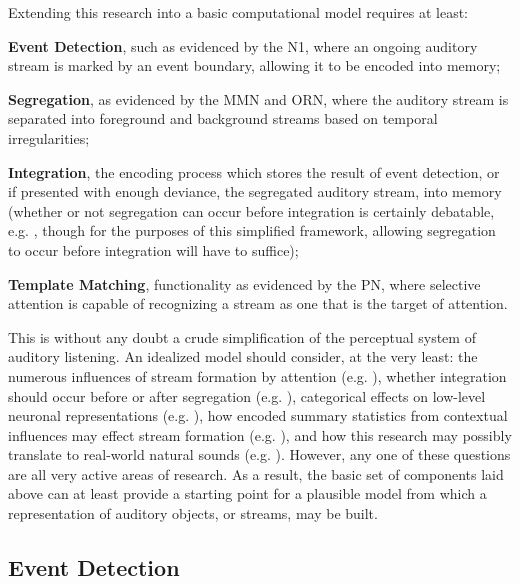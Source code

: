 \documentclass[a4paper,10pt,final]{ThesisStyle}
\begin{document}
Extending this research into a basic computational model requires at least: 
\begin{enumerateb}
\item \textbf{Event Detection}, such as evidenced by the N1, where an ongoing auditory stream is marked by an event boundary, allowing it to be encoded into memory; 
\item \textbf{Segregation}, as evidenced by the MMN and ORN, where the auditory stream is separated into foreground and background streams based on temporal irregularities;
\item \textbf{Integration}, the encoding process which stores the result of event detection, or if presented with enough deviance, the segregated auditory stream, into memory (whether or not segregation can occur before integration is certainly debatable, e.g. \cite{Sussman2005}, though for the purposes of this simplified framework, allowing segregation to occur before integration will have to suffice);
\item \textbf{Template Matching}, functionality as evidenced by the PN, where selective attention is capable of recognizing a stream as one that is the target of attention. 
\end{enumerateb}

This is without any doubt a crude simplification of the perceptual system of auditory listening.   An idealized model should consider, at the very least: the numerous influences of stream formation by attention (e.g. \cite{Shamma2011}), whether integration should occur before or after segregation (e.g. \cite{Sussman2005}), categorical effects on low-level neuronal representations (e.g. \cite{Samson2010}), how encoded summary statistics from contextual influences may effect stream formation (e.g. \cite{Piazza2013}), and how this research may possibly translate to real-world natural sounds (e.g. \cite{Moerel2013}).  However, any one of these questions are all very active areas of research.  As a result, the basic set of components laid above can at least provide a starting point for a plausible model from which a representation of auditory objects, or streams, may be built.  


\subsection{Event Detection}
\end{document}
